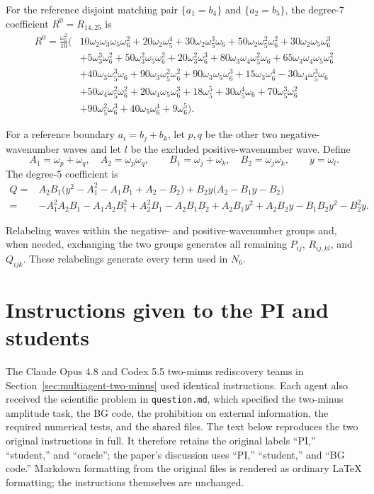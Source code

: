 \documentclass{article}
\begin{document}
For the reference disjoint matching pair
$\{a_1=b_4\}$ and $\{a_2=b_5\}$, the degree-7 coefficient
$R^0=R_{14,25}$ is
\[
\begin{aligned}
R^0=\frac{\omega_6^{2}}{10}\Big(&
10\omega_2\omega_3\omega_5\omega_6^{2}
+20\omega_2\omega_5^{4}
+30\omega_2\omega_5^{3}\omega_6
+50\omega_2\omega_5^{2}\omega_6^{2}
+30\omega_2\omega_5\omega_6^{3}\\
&+5\omega_3^{3}\omega_6^{2}
+50\omega_3^{2}\omega_5\omega_6^{2}
+20\omega_3^{2}\omega_6^{3}
+80\omega_3\omega_4\omega_5^{2}\omega_6
+65\omega_3\omega_4\omega_5\omega_6^{2}\\
&+40\omega_3\omega_5^{3}\omega_6
+90\omega_3\omega_5^{2}\omega_6^{2}
+90\omega_3\omega_5\omega_6^{3}
+15\omega_3\omega_6^{4}
-30\omega_4\omega_5^{3}\omega_6\\
&+50\omega_4\omega_5^{2}\omega_6^{2}
+20\omega_4\omega_5\omega_6^{3}
+18\omega_5^{5}
+30\omega_5^{4}\omega_6
+70\omega_5^{3}\omega_6^{2}\\
&+90\omega_5^{2}\omega_6^{3}
+40\omega_5\omega_6^{4}
+9\omega_6^{5}
\Big).
\end{aligned}
\]

For a reference boundary $a_i=b_j+b_k$, let $p,q$ be the other two
negative-wavenumber waves and let $l$ be the excluded positive-wavenumber wave. Define
\[
A_1=\omega_p+\omega_q,\quad A_2=\omega_p\omega_q,\qquad
B_1=\omega_j+\omega_k,\quad B_2=\omega_j\omega_k,\qquad
y=\omega_l.
\]
The degree-5 coefficient is
\[
\begin{aligned}
Q={}&A_2B_1\bigl(y^2-A_1^2-A_1B_1+A_2-B_2\bigr)
+B_2y\bigl(A_2-B_1y-B_2\bigr)\\
={}&-A_1^2A_2B_1-A_1A_2B_1^2+A_2^2B_1-A_2B_1B_2
+A_2B_1y^2+A_2B_2y-B_1B_2y^2-B_2^2y.
\end{aligned}
\]

Relabeling waves within the negative- and positive-wavenumber groups and, when needed,
exchanging the two groups generates all remaining $P_{ij}$, $R_{ij,kl}$, and
$Q_{ijk}$. These relabelings generate every term used in $N_6$.

\clearpage
\section{Instructions given to the PI and students}
\label{app:pi-student-prompts}

The Claude Opus 4.8 and Codex 5.5 two-minus rediscovery teams in
Section~\ref{sec:multiagent-two-minus} used identical instructions. Each agent
also received the scientific problem in \texttt{question.md}, which specified
the two-minus amplitude task, the BG code, the prohibition on external
information, the required numerical tests, and the shared files. The text
below reproduces the two original instructions in full. It therefore retains
the original labels ``PI,'' ``student,'' and ``oracle''; the paper's discussion
uses ``PI,'' ``student,'' and ``BG code.'' Markdown formatting from
the original files is rendered as ordinary \LaTeX{} formatting; the
instructions themselves are unchanged.
\end{document}
